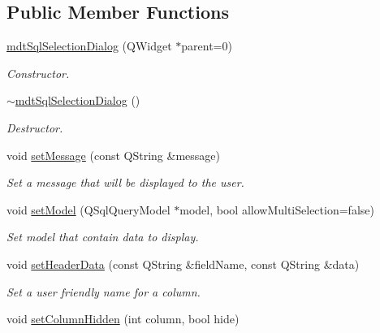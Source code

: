 \subsection*{Public Member Functions}
\begin{DoxyCompactItemize}
\item 
\hypertarget{classmdt_sql_selection_dialog_aaeb4d47e400bff8e58dec9f84f00517c}{
\hyperlink{classmdt_sql_selection_dialog_aaeb4d47e400bff8e58dec9f84f00517c}{mdtSqlSelectionDialog} (QWidget $\ast$parent=0)}
\label{classmdt_sql_selection_dialog_aaeb4d47e400bff8e58dec9f84f00517c}

\begin{DoxyCompactList}\small\item\em Constructor. \end{DoxyCompactList}\item 
\hypertarget{classmdt_sql_selection_dialog_a586e3cb812e5e9634f42cb40bfd2d724}{
\hyperlink{classmdt_sql_selection_dialog_a586e3cb812e5e9634f42cb40bfd2d724}{$\sim$mdtSqlSelectionDialog} ()}
\label{classmdt_sql_selection_dialog_a586e3cb812e5e9634f42cb40bfd2d724}

\begin{DoxyCompactList}\small\item\em Destructor. \end{DoxyCompactList}\item 
\hypertarget{classmdt_sql_selection_dialog_ab5ea543ebded60b4354c7c0902ca021f}{
void \hyperlink{classmdt_sql_selection_dialog_ab5ea543ebded60b4354c7c0902ca021f}{setMessage} (const QString \&message)}
\label{classmdt_sql_selection_dialog_ab5ea543ebded60b4354c7c0902ca021f}

\begin{DoxyCompactList}\small\item\em Set a message that will be displayed to the user. \end{DoxyCompactList}\item 
void \hyperlink{classmdt_sql_selection_dialog_aabe0554b9ca3f4a8d37a79e812dd8770}{setModel} (QSqlQueryModel $\ast$model, bool allowMultiSelection=false)
\begin{DoxyCompactList}\small\item\em Set model that contain data to display. \end{DoxyCompactList}\item 
void \hyperlink{classmdt_sql_selection_dialog_afc29f8965c2d6cc103d021ab54298a84}{setHeaderData} (const QString \&fieldName, const QString \&data)
\begin{DoxyCompactList}\small\item\em Set a user friendly name for a column. \end{DoxyCompactList}\item 
\hypertarget{classmdt_sql_selection_dialog_a8b7f8d24a959533ebe434443f19920c7}{
void \hyperlink{classmdt_sql_selection_dialog_a8b7f8d24a959533ebe434443f19920c7}{setColumnHidden} (int column, bool hide)}
\label{classmdt_sql_selection_dialog_a8b7f8d24a959533ebe434443f19920c7}


\end{DoxyCompactItemize}

